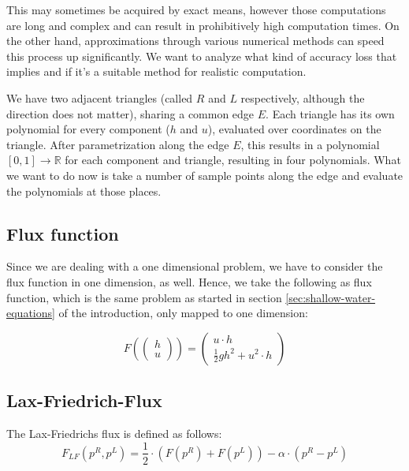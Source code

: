 \documentclass{article}
\newcommand{\reals}{\mathbb{R}}
\begin{document}
This may sometimes be acquired by exact means, however those computations are long and complex and can result in prohibitively high computation times. On the other hand, approximations through various numerical methods can speed this process up significantly. We want to analyze what kind of accuracy loss that implies and if it's a suitable method for realistic computation.

We have two adjacent triangles (called $R$ and $L$ respectively, although the direction does not matter), sharing a common edge $E$. Each triangle has its own polynomial for every component ($h$ and $u$), evaluated over coordinates on the triangle. After parametrization along the edge $E$, this results in a polynomial $[0,1]\rightarrow\reals$ for each component and triangle, resulting in four polynomials. What we want to do now is take a number of sample points along the edge and evaluate the polynomials at those places.

\subsection{Flux function}
\label{sec:flux-function-intro}

Since we are dealing with a one dimensional problem, we have to consider the flux function in one dimension, as well. Hence, we take the following as flux function, which is the same problem as started in section \ref{sec:shallow-water-equations} of the introduction, only mapped to one dimension:

\begin{equation}
  \label{eq:flux-function-definition}
  F\left(
    \begin{pmatrix}
      h \\ u
    \end{pmatrix}
  \right) = 
  \begin{pmatrix}
    u \cdot h \\
    \frac{1}{2} g h^2 + u^2 \cdot h
  \end{pmatrix}
\end{equation}

\subsection{Lax-Friedrich-Flux}
\label{sec:lax-friedrich-definition}

The Lax-Friedrichs flux is defined as follows:
\begin{equation}
  \label{eq:lax-friedrich-definition}
  F_{LF}(p^R,p^L) = \dfrac{1}{2}\cdot (F(p^R) + F(p^L)) - \alpha \cdot (p^R - p^L)
\end{equation}
\end{document}
